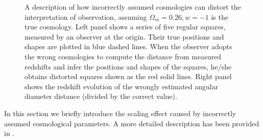 \documentclass[iop]{emulateapj}
\begin{document}
\begin{figure}
   \caption{\label{fig_xyquan}
   A description of how incorrectly assumed cosmologies can distort the interpretation of observation,
   assuming $\Omega_m=0.26,w=-1$ is the true cosmology. 
   Left panel shows a series of five regular squares, measured by an observer at the origin.
   Their true positions and shapes are plotted in blue dashed lines.
   When the observer adopts the wrong cosmologies to compute the distance from measured redshifts and infer the positions and shapes of the squares,
   he/she obtains distorted squares shown as the red solid lines.
   Right panel shows the redshift evolution of the wrongly estimated angular diameter distance (divided by the correct value).
   }
\end{figure}

In this section we briefly introduce the scaling effect caused by incorrectly assumed cosmological parameters.
A more detailed description has been provided in \cite{Li2014,Li2015,Li2016}.
\end{document}
